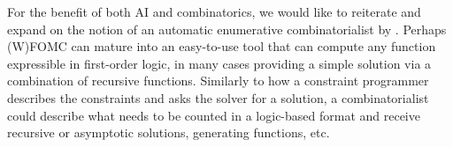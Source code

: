 For the benefit of both AI and combinatorics, we would like to reiterate and
expand on the notion of an automatic enumerative combinatorialist by
\citet{DBLP:conf/ilp/BarvinekB0ZK21}. Perhaps (W)FOMC can mature into an
easy-to-use tool that can compute any function expressible in first-order logic,
in many cases providing a simple solution via a combination of recursive
functions. Similarly to how a constraint programmer describes the constraints
and asks the solver for a solution, a combinatorialist could describe what needs
to be counted in a logic-based format and receive recursive or asymptotic
solutions, generating functions, etc.





